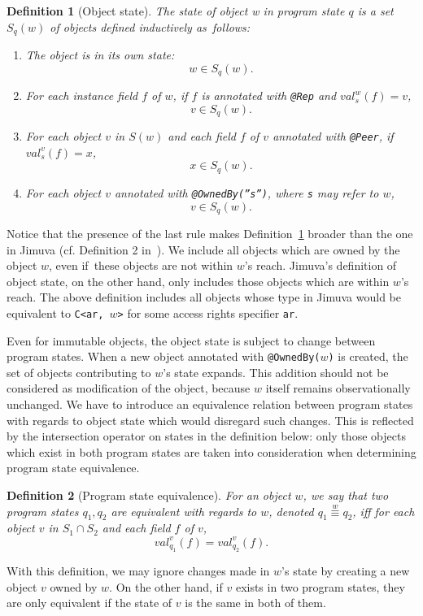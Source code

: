 \documentclass{pracamgr}
\theoremstyle{break}
\newtheorem{defi}{Definition}
\theoremstyle{break}
\theoremstyle{break}
\begin{document}
\begin{defi}[Object state]
  \label{def:state}
  The \emph{state of object w} in program state $q$ is a set $S_q(w)$
  of objects defined inductively as~follows:
  \begin{enumerate}[label=(\arabic*)]
  \item The object is in its own state: 
    $$w \in S_q(w).$$
  \item For each instance field $f$ of $w$, if $f$ is annotated with
    \texttt{@Rep} and $val_s^w(f) = v$,
    $$v \in S_q(w).$$
  \item For each object $v$ in $S(w)$ and each field $f$ of $v$
    annotated with \texttt{@Peer}, if $val_s^v(f) = x$, 
    $$ x \in S_q(w).$$
  \item For each object $v$ annotated with \texttt{@OwnedBy(''s'')},
    where \texttt{s} may refer to $w$,
    $$v \in S_q(w).$$
  \end{enumerate}
\end{defi}
Notice that the presence of the last rule makes
Definition~\ref{def:state} broader than the one in Jimuva
(cf. Definition 2 in~\cite{haack}). We include all objects which are
owned by the object $w$, even if~these objects are not within $w$'s
reach. Jimuva's definition of object state, on the other hand, only
includes those objects which are within $w$'s reach. The above
definition includes all objects whose type in Jimuva would be
equivalent to \texttt{C<ar, }$w$\texttt{>} for some access rights
specifier \texttt{ar}.

Even for immutable objects, the object state is subject to change
between program states. When a new object annotated with
\texttt{@OwnedBy($w$)} is created, the set of objects contributing to
$w$'s state expands. This addition should not be considered as
modification of the object, because $w$ itself remains observationally
unchanged. We have to introduce an equivalence relation between
program states with regards to object state which would disregard such
changes. This is reflected by the intersection operator on states in
the definition below: only those objects which exist in both program
states are taken into consideration when determining program state
equivalence.

\begin{defi}[Program state equivalence]
  For an object $w$, we say that two program states $q_1, q_2$ are
  \emph{equivalent with regards to $w$}, denoted $q_1
  \stackrel{w}{\equiv} q_2$, iff for each object $v$ in $S_1 \cap S_2$
  and each field $f$ of $v$,
  $$val_{q_1}^{v}(f) = val_{q_2}^{v}(f).$$
\end{defi}
With this definition, we may ignore changes made in $w$'s state by
creating a new object $v$ owned by $w$. On the other hand, if $v$
exists in two program states, they are only equivalent if the state of
$v$ is the same in both of them.
\end{document}

